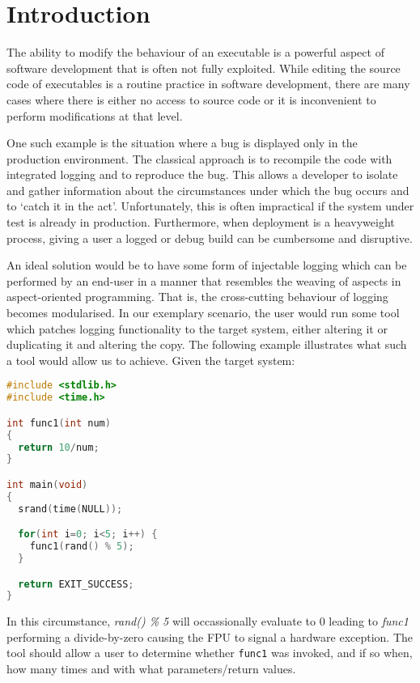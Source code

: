 \chapter{Introduction}\label{chap:Introduction}

The ability to modify the behaviour of an executable is a powerful aspect of software development that is often not fully exploited. While editing the source code of executables is a routine practice in software development, there are many cases where there is either no access to source code or it is inconvenient to perform modifications at that level.

One such example is the situation where a bug is displayed only in the production environment. The classical approach is to recompile the code with integrated logging and to reproduce the bug. This allows a developer to isolate and gather information about the circumstances under which the bug occurs and to `catch it in the act'. Unfortunately, this is often impractical if the system under test is already in production. Furthermore, when deployment is a heavyweight process, giving a user a logged or debug build can be cumbersome and disruptive.

An ideal solution would be to have some form of injectable logging which can be performed by an end-user in a manner that resembles the weaving of aspects in aspect-oriented programming. That is, the cross-cutting behaviour of logging becomes modularised. In our exemplary scenario, the user would run some tool which patches logging functionality to the target system, either altering it or duplicating it and altering the copy. The following example illustrates what such a tool would allow us to achieve. Given the target system:

\begin{lstlisting}[language=C,caption={Target Process}]
#include <stdlib.h>
#include <time.h>

int func1(int num)
{
  return 10/num;
}

int main(void)
{
  srand(time(NULL));

  for(int i=0; i<5; i++) {
    func1(rand() % 5);
  }

  return EXIT_SUCCESS;
}
\end{lstlisting}

In this circumstance, \emph{rand() \% 5} will occassionally evaluate to 0 leading to \emph{func1} performing a divide-by-zero causing the FPU to signal a hardware exception. The tool should allow a user to determine whether \texttt{func1} was invoked, and if so when, how many times and with what parameters/return values.

